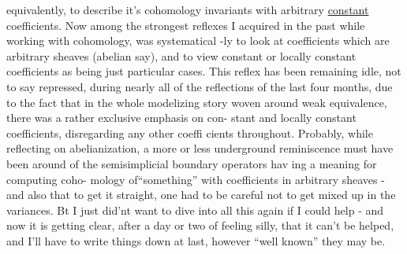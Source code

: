 
equivalently,  to describe it's cohomology invariants with 
 arbitrary \uline{constant}  coefficients.  Now among the strongest reflexes
I acquired in the past while working with cohomology,  was systematical
-ly to look at coefficients which are arbitrary sheaves  (abelian say),
and to view  constant or locally constant coefficients as being just
particular cases.  This reflex has been remaining idle,  not to say
repressed,  during nearly all of the reflections of the last four
months,  due to the fact that in the whole modelizing story woven 
around weak equivalence, there was a rather exclusive emphasis on con-%
stant and locally constant coefficients,  disregarding any other coeffi%
cients throughout.  Probably,  while reflecting on abelianization,
a more or less underground reminiscence must have been around of the
semisimplicial boundary operators hav ing a meaning for computing coho-%
mology of``something''\hand{,} with coefficients in arbitrary sheaves  -  and
also that to get it straight,  one had to be careful not to get 
mixed up in the variances.  Bt I just did'nt want to dive into all 
this again if I could help  -  and now it is getting clear,  after a
day or two of feeling silly,  that it can't be helped,  and I'll have
to write things down at last,  however ``well known'' they may be.

